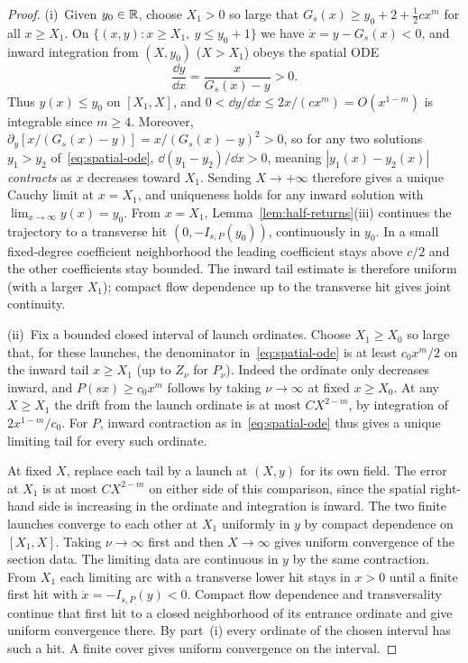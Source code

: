 \begin{proof}
(i)~Given $y_0\in\mathbb{R}$, choose $X_1>0$ so large that $G_s(x)\ge y_0+2+\tfrac12 c x^m$ for all $x\ge X_1$. On $\{(x,y):x\ge X_1,\ y\le y_0+1\}$ we have $\dot x=y-G_s(x)<0$, and inward integration from $(X,y_0)$ ($X>X_1$) obeys the spatial ODE
\begin{equation}\label{eq:spatial-ode}
  \frac{\dd y}{\dd x} = \frac{x}{G_s(x)-y} > 0.
\end{equation}
Thus $y(x)\le y_0$ on $[X_1,X]$, and $0<\dd y/\dd x\le 2x/(c x^m)=O(x^{1-m})$ is integrable since $m\ge 4$. Moreover, $\partial_y[x/(G_s(x)-y)]=x/(G_s(x)-y)^2>0$, so for any two solutions $y_1>y_2$ of~\eqref{eq:spatial-ode}, $\dd(y_1-y_2)/\dd x>0$, meaning $|y_1(x)-y_2(x)|$ \emph{contracts} as $x$ decreases toward $X_1$. Sending $X\to+\infty$ therefore gives a unique Cauchy limit at $x=X_1$, and uniqueness holds for any inward solution with $\lim_{x\to\infty}y(x)=y_0$. From $x=X_1$, Lemma~\ref{lem:half-returns}(iii) continues the trajectory to a transverse hit $(0,-I_{s,P}(y_0))$, continuously in $y_0$. In a small fixed-degree coefficient neighborhood the leading coefficient stays above $c/2$ and the other coefficients stay bounded. The inward tail estimate is therefore uniform (with a larger $X_1$); compact flow dependence up to the transverse hit gives joint continuity.

(ii)~Fix a bounded closed interval of launch ordinates. Choose $X_1\ge X_0$ so large that, for these launches,
the denominator in~\eqref{eq:spatial-ode} is at least $c_0x^m/2$ on the
inward tail $x\ge X_1$ (up to $Z_\nu$ for $P_\nu$). Indeed the ordinate
only decreases inward, and $P(sx)\ge c_0x^m$ follows by taking $\nu\to\infty$
at fixed $x\ge X_0$. At any $X\ge X_1$ the drift from the launch
ordinate is at most $C X^{2-m}$, by integration of $2x^{1-m}/c_0$.
For $P$, inward contraction as in~\eqref{eq:spatial-ode} thus gives a
unique limiting tail for every such ordinate.

At fixed $X$, replace each tail by a launch at $(X,y)$ for its own
field. The error at $X_1$ is at most $CX^{2-m}$ on either side of this
comparison, since the spatial right-hand side is increasing in the
ordinate and integration is inward. The two finite launches converge
to each other at $X_1$ uniformly in $y$ by compact dependence on
$[X_1,X]$. Taking $\nu\to\infty$ first and then $X\to\infty$ gives
uniform convergence of the section data. The limiting data are
continuous in $y$ by the same contraction.
From $X_1$ each limiting arc with a transverse lower hit stays in $x>0$ until a finite
first hit with $\dot x=-I_{s,P}(y)<0$. Compact flow dependence and
transversality continue that first hit to a closed neighborhood of
its entrance ordinate and give uniform convergence there. By part~(i) every ordinate of the chosen interval has such a hit.
A finite cover gives uniform convergence on the interval.


\end{proof}
